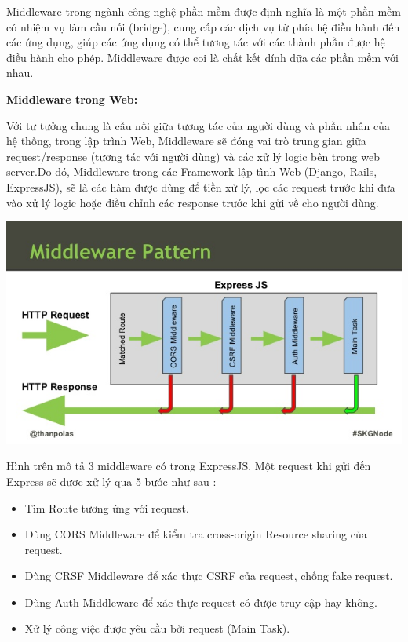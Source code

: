 
Middleware trong ngành công nghệ phần mềm được định nghĩa là một phần mềm có nhiệm vụ làm cầu nối (bridge), cung cấp các dịch vụ từ phía hệ điều hành đến các ứng dụng, giúp các ứng dụng có thể tương tác với các thành phần được hệ điều hành cho phép. Middleware được coi là chất kết dính dữa các phần mềm với nhau.

\textbf{Middleware trong Web:} 

Với tư tưởng chung là cầu nối giữa tương tác của người dùng và phần nhân của hệ thống, trong lập trình Web, Middleware sẽ đóng vai trò trung gian giữa request/response (tương tác với người dùng) và các xử lý logic bên trong web server.Do đó, Middleware trong các Framework lập tình Web (Django, Rails, ExpressJS), sẽ là các hàm được dùng để tiền xử lý, lọc các request trước khi đưa vào xử lý logic hoặc điều chỉnh các response trước khi gửi về cho người dùng.

\begin{center}
  \captionsetup{type=figure}
  \includegraphics[width=15cm]{img/expressjsmiddleware.jpg}
\end{center}

Hình trên mô tả 3 middleware có trong ExpressJS. Một request khi gửi đến Express sẽ được xử lý qua 5 bước như sau :
\begin{itemize}
  \item Tìm Route tương ứng với request.
  \item Dùng CORS Middleware để kiểm tra cross-origin Resource sharing của request.
  \item Dùng CRSF Middleware để xác thực CSRF của request, chống fake request.
  \item Dùng Auth Middleware để xác thực request có được truy cập hay không.
  \item Xử lý công việc được yêu cầu bởi request (Main Task).
\end{itemize}

